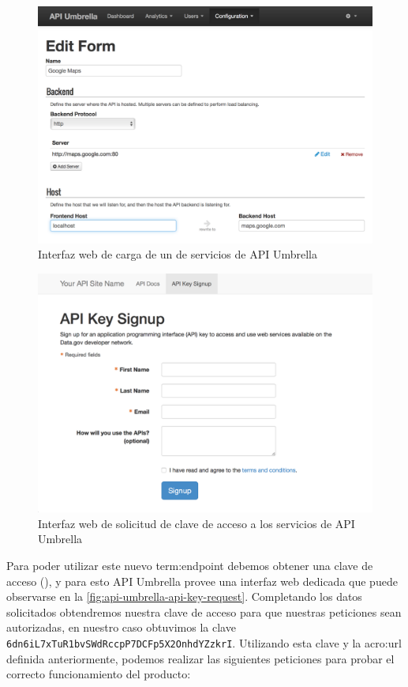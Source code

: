 \begin{figure}
  \includegraphics[width=\linewidth]{src/images/03-capitulo-3/tecnologias/api-umbrella/api-backend.png}
  \caption{Interfaz web de carga de un  de servicios de API Umbrella}
  \label{fig:api-umbrella-api-backend}
\end{figure}

\begin{figure}
  \includegraphics[width=\linewidth]{src/images/03-capitulo-3/tecnologias/api-umbrella/api-key-request.png}
  \caption{Interfaz web de solicitud de clave de acceso a los servicios de API Umbrella}
  \label{fig:api-umbrella-api-key-request}
\end{figure}

Para poder utilizar este nuevo \gls{term:endpoint} debemos obtener una clave de acceso (), y para esto API Umbrella provee una interfaz web dedicada que puede observarse en la \autoref{fig:api-umbrella-api-key-request}. Completando los datos solicitados obtendremos nuestra clave de acceso para que nuestras peticiones sean autorizadas, en nuestro caso obtuvimos la clave \texttt{6dn6iL7xTuR1bvSWdRccpP7DCFp5X2OnhdYZzkrI}. Utilizando esta clave y la \gls{acro:url} definida anteriormente, podemos realizar las siguientes peticiones para probar el correcto funcionamiento del producto:

